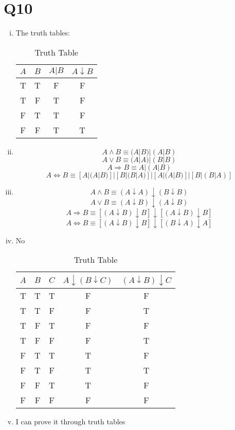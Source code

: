 \documentclass[12pt]{article}
\begin{document}
\section{Q10}
\begin{enumerate}[(i)]
\item
The truth tables:
\begin{table}[H]
\centering
\begin{tabular}{|c|c|c|c|}
\hline
$A$ & $B$ &$A|B$ &$A\downarrow B$\\ \hline
T & T &F  &F  \\ \hline
T & F &T  &F  \\ \hline
F & T &T  &F  \\ \hline
F & F &T  &T  \\ \hline
\end{tabular}
\caption{Truth Table}
\end{table}
\item
$$A\wedge B\equiv (A|B)|(A|B)$$
$$A\vee B\equiv(A|A)|(B|B)$$
$$A\Rightarrow B\equiv A|(A|B)$$
$$A\Leftrightarrow B\equiv[A|(A|B)]|[B|(B|A)]|[A|(A|B)]|[B|(B|A)]$$
\item
$$A\wedge B\equiv(A\downarrow A)\downarrow(B\downarrow B)$$
$$A\vee B\equiv(A\downarrow B)\downarrow(A\downarrow B)$$
$$A\Rightarrow B\equiv [(A\downarrow B)\downarrow B]\downarrow[(A\downarrow B)\downarrow B]$$
$$A\Leftrightarrow B\equiv[(A\downarrow B)\downarrow B]\downarrow[(B\downarrow A)\downarrow A]$$
\item No
\begin{table}[H]
\centering
\begin{tabular}{|c|c|c|c|c|}
\hline
$A$ & $B$ &$C$ &$A\downarrow (B\downarrow C)$&$(A\downarrow B)\downarrow C$\\ \hline
T & T &T  &F &F  \\ \hline
T & T &F  &F &T \\ \hline
T & F &T  &F &F \\ \hline
T & F &F  &F &T \\ \hline
F & T &T  &T &F \\ \hline
F & T &F  &T &T \\ \hline
F & F &T  &T &F \\ \hline
F & F &F  &F &F \\ \hline
\end{tabular}
\caption{Truth Table}
\end{table}
\item
I can prove it through truth tables
\begin{table}[H]
\centering
\begin{tabular}{|c|c|c|c|c|c|c|}

\end{tabular}
\end{table}
\end{enumerate}
\end{document}
